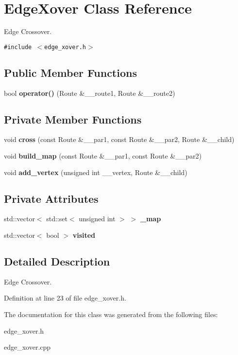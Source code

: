 \section{EdgeXover Class Reference}
\label{class_edge_xover}
Edge Crossover.  


{\tt \#include $<$edge\_\-xover.h$>$}

\subsection*{Public Member Functions}
\begin{CompactItemize}
\item 
bool {\bf operator()} (Route \&\_\-\_\-route1, Route \&\_\-\_\-route2)\label{class_edge_xover_cb1c0a103106a4d3319540cb23163a79}

\end{CompactItemize}
\subsection*{Private Member Functions}
\begin{CompactItemize}
\item 
void {\bf cross} (const Route \&\_\-\_\-par1, const Route \&\_\-\_\-par2, Route \&\_\-\_\-child)\label{class_edge_xover_88c2d4c9a878454a32d56010f3dddc27}

\item 
void {\bf build\_\-map} (const Route \&\_\-\_\-par1, const Route \&\_\-\_\-par2)\label{class_edge_xover_04de96aa1016836e0ba5f4b952a5fa16}

\item 
void {\bf add\_\-vertex} (unsigned int \_\-\_\-vertex, Route \&\_\-\_\-child)\label{class_edge_xover_b590458c35c16a14896a4bcdf9674ade}

\end{CompactItemize}
\subsection*{Private Attributes}
\begin{CompactItemize}
\item 
std::vector$<$ std::set$<$ unsigned int $>$ $>$ {\bf \_\-map}\label{class_edge_xover_7d9272c12cfa55df4677d5ad837a0e5c}

\item 
std::vector$<$ bool $>$ {\bf visited}\label{class_edge_xover_46d4d4724cf6d660b1a7ab4a346573d4}

\end{CompactItemize}


\subsection{Detailed Description}
Edge Crossover. 



Definition at line 23 of file edge\_\-xover.h.

The documentation for this class was generated from the following files:\begin{CompactItemize}
\item 
edge\_\-xover.h\item 
edge\_\-xover.cpp\end{CompactItemize}
